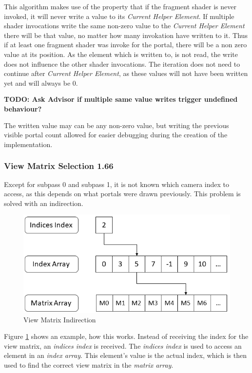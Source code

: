 This algorithm makes use of the property that if the fragment shader is never invoked, it will never write a value to its \textit{Current Helper Element}. If multiple shader invocations write the same non-zero value to the \textit{Current Helper Element} there will be that value, no matter how many invokation have written to it.
Thus if at least one fragment shader was invoke for the portal, there will be a non zero value at its position. As the element which is written to, is not read, the write does not influence the other shader invocations. The iteration does not need to continue after \textit{Current Helper Element}, as these values will not have been written yet and will always be 0.

 \textbf{ \huge TODO: Ask Advisor if multiple same value writes trigger undefined behaviour? }%

The written value may can be any non-zero value, but writing the previous visible portal count allowed for easier debugging during the creation of the implementation.


\subsubsection{View Matrix Selection 1.66}
Except for subpass 0 and subpass 1, it is not known which camera index to access, as this depends on what portals were drawn previously. This problem is solved with an indirection.

\begin{figure}[h]
	\includegraphics[width=\linewidth]{images/viewmatrixindirection.png}
	\caption{View Matrix Indirection}
	\label{fig:viewmatrixindirection}
\end{figure}

Figure \ref{fig:viewmatrixindirection} shows an example, how this works. Instead of receiving the index for the view matrix, an \textit{indices index} is received. The \textit{indices index} is used to access an element in an \textit{index array}. This element's value is the actual index, which is then used to find the correct view matrix in the \textit{matrix array}.

